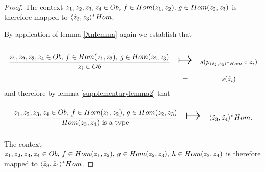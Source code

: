 \begin{proof}
The context $z_1,z_2,z_3,z_4 \in Ob,\,f \in Hom(z_1,z_2),\,g \in Hom(z_2,z_3)$ is therefore mapped to $\langle\dot z_2,\dot z_3\rangle^*Hom$.

By application of lemma \ref{Xnlemma} again we establish that 

\begin{equation*}
\begin{array}{c c c}
\forceSOURCEwidth & & \forceTARGETwidth \\ [-0.1cm]
\gatdisplayrule{\associativitypremisepop}{\ofT{z_i}{Ob}} & \Imapsto & s(p_{\associativitypremisepopmapped} \circ z_i) \\
                                                            & = & s(\ddot{z_i})
\end{array}
\end{equation*}
and therefore by  lemma \ref{supplementarylemma2} that 
\begin{equation*}
\begin{array}{c c c}
\forceSOURCEwidth & & \forceTARGETwidth \\ [-0.1cm]
\gatdisplayrule{\associativitypremisepop}{\isT{Hom(z_3,z_4)}} & \Imapsto & \associativitypremisemapped.
\end{array}
\end{equation*}

The context $z_1,z_2,z_3,z_4 \in Ob,\,f \in Hom(z_1,z_2),\,g \in Hom(z_2,z_3),\,h \in Hom(z_3,z_4)$ is therefore mapped to $\langle\ddot z_3,\ddot z_4\rangle^*Hom$.

\end{proof}



